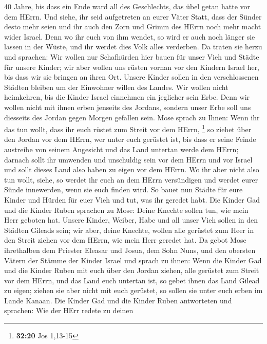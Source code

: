 40 Jahre, bis dass ein Ende ward all des Geschlechts, das übel getan
hatte vor dem HErrn.  Und siehe, ihr seid aufgetreten an
eurer Väter Statt, dass der Sünder desto mehr seien und ihr auch den
Zorn und Grimm des HErrn noch mehr macht wider Israel. 
Denn wo ihr euch von ihm wendet, so wird er auch noch länger sie lassen
in der Wüste, und ihr werdet dies Volk alles verderben.  Da
traten sie herzu und sprachen: Wir wollen nur Schafhürden hier bauen für
unser Vieh und Städte für unsere Kinder;  wir aber wollen
uns rüsten vornan vor den Kindern Israel her, bis dass wir sie bringen
an ihren Ort. Unsere Kinder sollen in den verschlossenen Städten bleiben
um der Einwohner willen des Landes.  Wir wollen nicht
heimkehren, bis die Kinder Israel einnehmen ein jeglicher sein Erbe.
 Denn wir wollen nicht mit ihnen erben jenseits des
Jordans, sondern unser Erbe soll uns diesseits des Jordan gegen Morgen
gefallen sein.  Mose sprach zu Ihnen: Wenn ihr das tun
wollt, dass ihr euch rüstet zum Streit vor dem HErrn, \footnote{\textbf{32:20}
  Jos 1,13-15}  so ziehet über den Jordan vor dem HErrn,
wer unter euch gerüstet ist, bis dass er seine Feinde austreibe von
seinem Angesicht  und das Land untertan werde dem HErrn;
darnach sollt ihr umwenden und unschuldig sein vor dem HErrn und vor
Israel und sollt dieses Land also haben zu eigen vor dem HErrn.
 Wo ihr aber nicht also tun wollt, siehe, so werdet ihr
euch an dem HErrn versündigen und werdet eurer Sünde innewerden, wenn
sie euch finden wird.  So bauet nun Städte für eure Kinder
und Hürden für euer Vieh und tut, was ihr geredet habt. 
Die Kinder Gad und die Kinder Ruben sprachen zu Mose: Deine Knechte
sollen tun, wie mein Herr geboten hat.  Unsere Kinder,
Weiber, Habe und all unser Vieh sollen in den Städten Gileads sein;
 wir aber, deine Knechte, wollen alle gerüstet zum Heer in
den Streit ziehen vor dem HErrn, wie mein Herr geredet hat.
 Da gebot Mose ihrethalben dem Priester Eleasar und Josua,
dem Sohn Nuns, und den obersten Vätern der Stämme der Kinder Israel
 und sprach zu ihnen: Wenn die Kinder Gad und die Kinder
Ruben mit euch über den Jordan ziehen, alle gerüstet zum Streit vor dem
HErrn, und das Land euch untertan ist, so gebet ihnen das Land Gilead zu
eigen;  ziehen sie aber nicht mit euch gerüstet, so sollen
sie unter euch erben im Lande Kanaan.  Die Kinder Gad und
die Kinder Ruben antworteten und sprachen: Wie der HErr redete zu deinen
